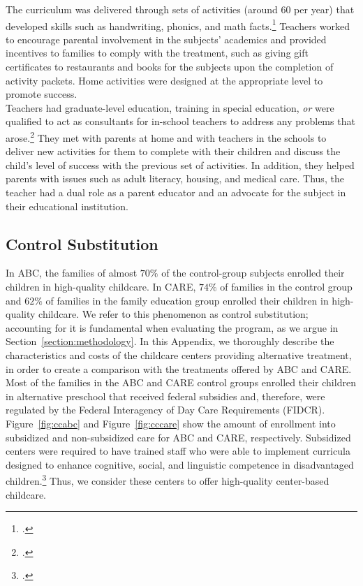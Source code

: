 \begin{appendices}
\noindent The curriculum was delivered through sets of activities (around 60 per year) that developed skills such as handwriting, phonics, and math facts.\footnote{\cite{Campbell-Ramey_1989_Preschool-vs-School-age}.} Teachers worked to encourage parental involvement in the subjects' academics and provided incentives to families to comply with the treatment, such as giving gift certificates to restaurants and books for the subjects upon the completion of activity packets. Home activities were designed at the appropriate level to promote success.\\

\noindent Teachers had graduate-level education, training in special education, \textit{or} were qualified to act as consultants for in-school teachers to address any problems that arose.\footnote{\cite{Ramey_Campbell_1991_childreninpoverty}.} They met with parents at home and with teachers in the schools to deliver new activities for them to complete with their children and discuss the child's level of success with the previous set of activities. In addition, they helped parents with issues such as adult literacy, housing, and medical care. Thus, the teacher had a dual role as a parent educator and an advocate for the subject in their educational institution.

\subsection{Control Substitution}

\noindent In ABC, the families of almost $70\%$ of the control-group subjects enrolled their children in high-quality childcare. In CARE, $74\%$ of families in the control group and $62\%$ of families in the family education group enrolled their children in high-quality childcare. We refer to this phenomenon as control substitution; accounting for it is fundamental when evaluating the program, as we argue in Section~\ref{section:methodology}. In this Appendix, we thoroughly describe the characteristics and costs of the childcare centers providing alternative treatment, in order to create a comparison with the treatments offered by ABC and CARE.\\

\noindent Most of the families in the ABC and CARE control groups enrolled their children in alternative preschool that received federal subsidies and, therefore, were regulated by the Federal Interagency of Day Care Requirements (FIDCR). Figure~\ref{fig:ccabc} and Figure~\ref{fig:cccare} show the amount of enrollment into subsidized and non-subsidized care for ABC and CARE, respectively. Subsidized centers were required to have trained staff who were able to implement curricula designed to enhance cognitive, social, and linguistic competence in disadvantaged children.\footnote{\citet{Burchinal_etal_1989_CD_Daycare-Pre-K-Dev}.} Thus, we consider these centers to offer high-quality center-based childcare.


\end{appendices}
